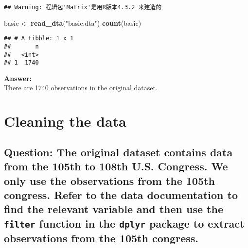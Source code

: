 \documentclass[
]{article}
\newenvironment{Shaded}{\begin{snugshade}}{\end{snugshade}}
\newcommand{\FunctionTok}[1]{\textcolor[rgb]{0.13,0.29,0.53}{\textbf{#1}}}
\newcommand{\NormalTok}[1]{#1}
\newcommand{\OtherTok}[1]{\textcolor[rgb]{0.56,0.35,0.01}{#1}}
\newcommand{\StringTok}[1]{\textcolor[rgb]{0.31,0.60,0.02}{#1}}
\begin{document}
\begin{verbatim}
## Warning: 程辑包'Matrix'是用R版本4.3.2 来建造的
\end{verbatim}

\begin{Shaded}
\begin{Highlighting}[]
\NormalTok{basic }\OtherTok{\textless{}{-}} \FunctionTok{read\_dta}\NormalTok{(}\StringTok{"basic.dta"}\NormalTok{)}
\FunctionTok{count}\NormalTok{(basic)}
\end{Highlighting}
\end{Shaded}

\begin{verbatim}
## # A tibble: 1 x 1
##       n
##   <int>
## 1  1740
\end{verbatim}

\textbf{Answer:}\\
There are 1740 observations in the original dataset.

\clearpage

\hypertarget{cleaning-the-data}{%
\section{Cleaning the data}\label{cleaning-the-data}}

\hypertarget{question-the-original-dataset-contains-data-from-the-105th-to-108th-u.s.-congress.-we-only-use-the-observations-from-the-105th-congress.-refer-to-the-data-documentation-to-find-the-relevant-variable-and-then-use-the-filter-function-in-the-dplyr-package-to-extract-observations-from-the-105th-congress.}{%
\subsection{\texorpdfstring{Question: The original dataset contains data
from the 105th to 108th U.S. Congress. We only use the observations from
the 105th congress. Refer to the data documentation to find the relevant
variable and then use the \texttt{filter} function in the \texttt{dplyr}
package to extract observations from the 105th
congress.}{Question: The original dataset contains data from the 105th to 108th U.S. Congress. We only use the observations from the 105th congress. Refer to the data documentation to find the relevant variable and then use the filter function in the dplyr package to extract observations from the 105th congress.}}\label{question-the-original-dataset-contains-data-from-the-105th-to-108th-u.s.-congress.-we-only-use-the-observations-from-the-105th-congress.-refer-to-the-data-documentation-to-find-the-relevant-variable-and-then-use-the-filter-function-in-the-dplyr-package-to-extract-observations-from-the-105th-congress.}}
\end{document}
